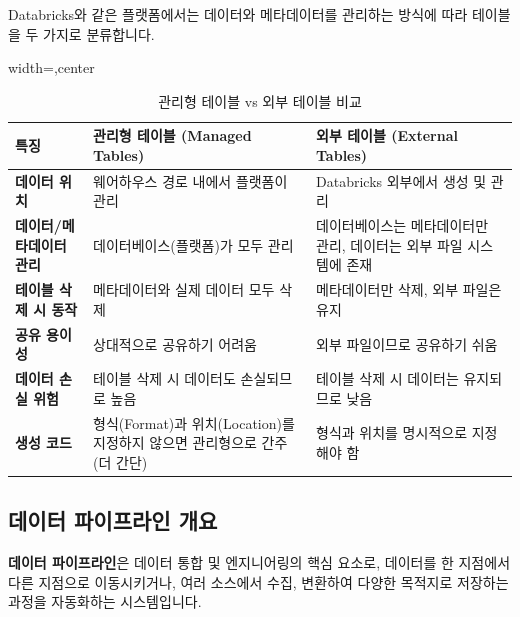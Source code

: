 \documentclass[11pt,a4paper]{article}
\theoremstyle{definition}
\begin{document}
Databricks와 같은 플랫폼에서는 데이터와 메타데이터를 관리하는 방식에 따라 테이블을 두 가지로 분류합니다.

\begin{table}[htbp]
\centering
\caption{관리형 테이블 vs 외부 테이블 비교}
\label{tab:managed_vs_external_tables}
\begin{adjustbox}{width=\textwidth,center}
\begin{tabular}{lll}
\toprule
\textbf{특징} & \textbf{관리형 테이블 (Managed Tables)} & \textbf{외부 테이블 (External Tables)} \\
\midrule
\textbf{데이터 위치} & 웨어하우스 경로 내에서 플랫폼이 관리 & Databricks 외부에서 생성 및 관리 \\
\textbf{데이터/메타데이터 관리} & 데이터베이스(플랫폼)가 모두 관리 & 데이터베이스는 메타데이터만 관리, 데이터는 외부 파일 시스템에 존재 \\
\textbf{테이블 삭제 시 동작} & 메타데이터와 실제 데이터 모두 삭제 & 메타데이터만 삭제, 외부 파일은 유지 \\
\textbf{공유 용이성} & 상대적으로 공유하기 어려움 & 외부 파일이므로 공유하기 쉬움 \\
\textbf{데이터 손실 위험} & 테이블 삭제 시 데이터도 손실되므로 높음 & 테이블 삭제 시 데이터는 유지되므로 낮음 \\
\textbf{생성 코드} & 형식(Format)과 위치(Location)를 지정하지 않으면 관리형으로 간주 (더 간단) & 형식과 위치를 명시적으로 지정해야 함 \\
\bottomrule
\end{tabular}
\end{adjustbox}
\end{table}

\subsection{데이터 파이프라인 개요}

\begin{conceptbox}
\textbf{데이터 파이프라인}은 데이터 통합 및 엔지니어링의 핵심 요소로, 데이터를 한 지점에서 다른 지점으로 이동시키거나, 여러 소스에서 수집, 변환하여 다양한 목적지로 저장하는 과정을 자동화하는 시스템입니다.
\end{conceptbox}
\end{document}

